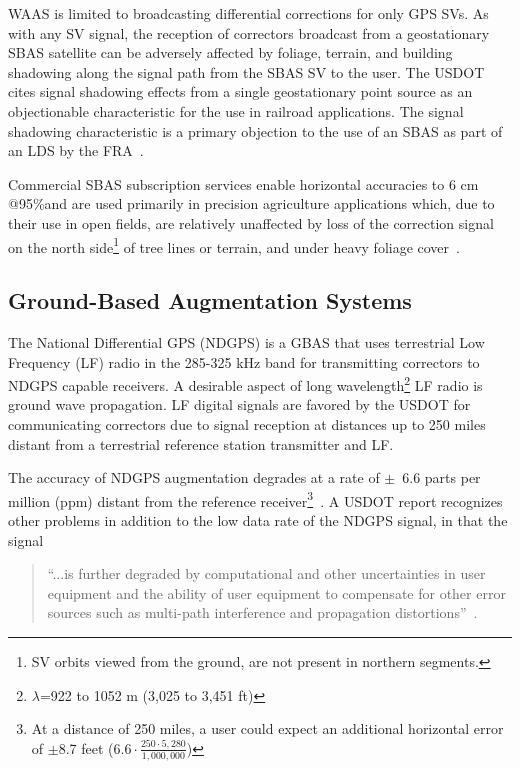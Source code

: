 WAAS is limited to broadcasting differential corrections for only GPS SVs. As with any SV signal, the reception of correctors broadcast from a geostationary SBAS satellite can be adversely affected by foliage, terrain, and building shadowing along the signal path from the SBAS SV to the user. The USDOT cites signal shadowing effects from a single geostationary point source as an objectionable characteristic for the use in railroad applications. The signal shadowing characteristic is a primary objection to the use of an SBAS as part of an LDS by the FRA~\citep{2008USDoT_NDGPS}.

Commercial SBAS subscription services enable horizontal accuracies to 6 cm @95\%and are used primarily in precision agriculture applications which, due to their use in open fields, are relatively unaffected by loss of the correction signal on the north side\footnote{SV orbits viewed from the ground, are not present in northern segments.} of tree lines or terrain, and under heavy foliage cover~\citep{2005fugro}.

\subsection{Ground-Based Augmentation Systems}  %
The National Differential GPS (NDGPS) is a GBAS that uses terrestrial Low Frequency (LF) radio in the 285-325 kHz band for transmitting correctors to NDGPS capable receivers. A desirable aspect of long wavelength\footnote{$\lambda$=922 to 1052 m (3,025 to 3,451 ft)} LF radio is ground wave propagation. LF digital signals are favored by the USDOT for communicating correctors due to signal reception at distances up to 250 miles distant from a terrestrial reference station transmitter and LF.

The accuracy of NDGPS augmentation degrades at a rate of $\pm$~6.6 parts per million (ppm) distant from the reference receiver\footnote{At a distance of 250 miles, a user could expect an additional horizontal error of $\pm$8.7 feet ($6.6\cdot\frac{250\cdot5,280}{1,000,000}$)}~\citep{2000FRA_gps_ant}. A USDOT report recognizes other problems in addition to the low data rate of the NDGPS signal, in that the signal
\begin{quotation}
``...is further degraded by computational and other uncertainties in user equipment and the ability of user equipment to compensate for other error sources such as multi-path interference and propagation distortions''~\citep{2008USDoT_NDGPS}.
\end{quotation} 

